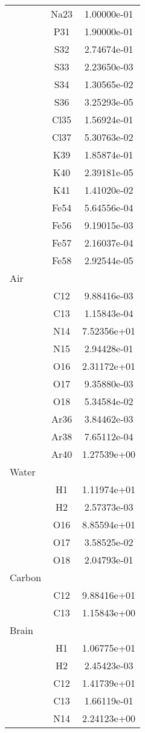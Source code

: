 \begin{centering}
\begin{longtable}{l c c}
& Na23 & 1.00000e-01 \\ 
& P31 & 1.90000e-01 \\ 
& S32 & 2.74674e-01 \\ 
& S33 & 2.23650e-03 \\ 
& S34 & 1.30565e-02 \\ 
& S36 & 3.25293e-05 \\ 
& Cl35 & 1.56924e-01 \\ 
& Cl37 & 5.30763e-02 \\ 
& K39 & 1.85874e-01 \\ 
& K40 & 2.39181e-05 \\ 
& K41 & 1.41020e-02 \\ 
& Fe54 & 5.64556e-04 \\ 
& Fe56 & 9.19015e-03 \\ 
& Fe57 & 2.16037e-04 \\ 
& Fe58 & 2.92544e-05 \\ 
\hline
Air & & \\
\hline
& C12 & 9.88416e-03 \\ 
& C13 & 1.15843e-04 \\ 
& N14 & 7.52356e+01 \\ 
& N15 & 2.94428e-01 \\ 
& O16 & 2.31172e+01 \\ 
& O17 & 9.35880e-03 \\ 
& O18 & 5.34584e-02 \\ 
& Ar36 & 3.84462e-03 \\ 
& Ar38 & 7.65112e-04 \\ 
& Ar40 & 1.27539e+00 \\ 
\hline
Water & & \\
\hline
& H1 & 1.11974e+01 \\ 
& H2 & 2.57373e-03 \\ 
& O16 & 8.85594e+01 \\ 
& O17 & 3.58525e-02 \\ 
& O18 & 2.04793e-01 \\ 
\hline
Carbon & & \\
\hline
& C12 & 9.88416e+01 \\ 
& C13 & 1.15843e+00 \\ 
\hline
Brain & & \\
\hline
& H1 & 1.06775e+01 \\ 
& H2 & 2.45423e-03 \\ 
& C12 & 1.41739e+01 \\ 
& C13 & 1.66119e-01 \\ 
& N14 & 2.24123e+00 \\ 

\end{longtable}
\end{centering}

